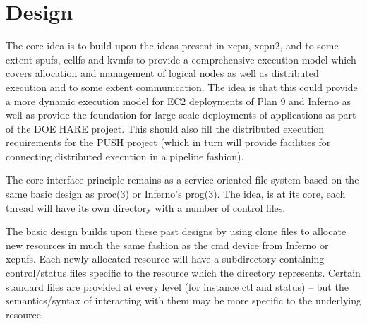 \documentclass{sig-alternate}
\begin{document}
\section{Design}

The core idea is to build upon the ideas present in xcpu, xcpu2, and
to some extent spufs, cellfs and kvmfs to provide a comprehensive
execution model which covers allocation and management of logical 
nodes as well as distributed execution and to some extent communication.  
The idea is that this could provide a more dynamic execution
model for EC2 deployments of Plan 9 and Inferno as well as 
provide the foundation for large scale deployments of applications
as part of the DOE HARE project.  This should also fill the distributed
execution requirements for the PUSH project (which in turn will provide
facilities for connecting distributed execution in a pipeline fashion).


The core interface principle remains as a service-oriented file system
based on the same basic design as proc(3) or Inferno's prog(3).  
The idea, is at its core, each thread will have its own directory with a 
number of control files.  

The basic design builds upon these past designs by using clone files to
allocate new resources in much the same fashion as the cmd device from Inferno
or xcpufs.  Each newly allocated resource will have a subdirectory
containing control/status files specific to the resource which the directory 
represents.  Certain standard files are provided at every level 
(for instance ctl and status) -- but the semantics/syntax of interacting with 
them may be more specific to the underlying resource.
\end{document}
